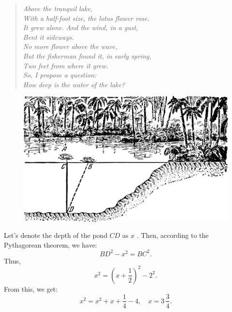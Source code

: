 \ques 
\begin{quote}
\emph{
Above the tranquil lake, \\
With a half-foot size, the lotus flower rose. \\
It grew alone. And the wind, in a gust, \\
Bent it sideways. \\
No more flower above the wave, \\
But the fisherman found it, in early spring, \\
Two feet from where it grew.\\
So, I propose a question: \\
How deep is the water of the lake?}\\[-15pt]
\end{quote}

\begin{figure}[h!]
\centering
\includegraphics[width=\textwidth]{figures/ch-02/fig-053.pdf}
\end{figure}



\ans Let's denote the depth of the pond $CD$ as \( x \) . Then, according to the Pythagorean theorem, we have:
\begin{equation*}%
BD^{2} - x^{2} = BC^{2}.
\end{equation*}
Thus, 
\begin{equation*}%
x^{2} = \left( x + \frac{1}{2} \right)^{2} - 2^{2}.
\end{equation*}
From this, we get:
\begin{equation*}%
x^{2} = x^{2}  + x + \frac{1}{4} - 4 , \quad x = 3\,\frac{3}{4}.
\end{equation*}

